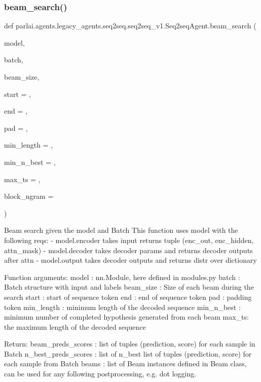 \subsubsection{\texorpdfstring{beam\+\_\+search()}{beam\_search()}}
{\footnotesize\ttfamily def parlai.\+agents.\+legacy\+\_\+agents.\+seq2seq.\+seq2seq\+\_\+v1.\+Seq2seq\+Agent.\+beam\+\_\+search (\begin{DoxyParamCaption}\item[{}]{model,  }\item[{}]{batch,  }\item[{}]{beam\+\_\+size,  }\item[{}]{start = {},  }\item[{}]{end = {},  }\item[{}]{pad = {},  }\item[{}]{min\+\_\+length = {},  }\item[{}]{min\+\_\+n\+\_\+best = {},  }\item[{}]{max\+\_\+ts = {},  }\item[{}]{block\+\_\+ngram = {} }\end{DoxyParamCaption})\hspace{0.3cm}{\ttfamily [static]}}

\begin{DoxyVerb}Beam search given the model and Batch
This function uses model with the following reqs:
- model.encoder takes input returns tuple (enc_out, enc_hidden, attn_mask)
- model.decoder takes decoder params and returns decoder outputs after attn
- model.output takes decoder outputs and returns distr over dictionary

Function arguments:
model : nn.Module, here defined in modules.py
batch : Batch structure with input and labels
beam_size : Size of each beam during the search
start : start of sequence token
end : end of sequence token
pad : padding token
min_length : minimum length of the decoded sequence
min_n_best : minimum number of completed hypothesis generated from each beam
max_ts: the maximum length of the decoded sequence

Return:
beam_preds_scores : list of tuples (prediction, score) for each sample in Batch
n_best_preds_scores : list of n_best list of tuples (prediction, score) for
              each sample from Batch
beams : list of Beam instances defined in Beam class, can be used for any
following postprocessing, e.g. dot logging.
\end{DoxyVerb}
 

